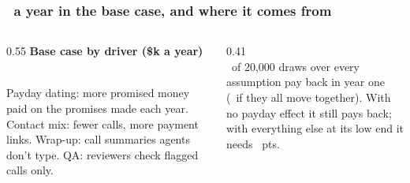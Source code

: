 \documentclass[aspectratio=169,10pt]{beamer}
\begin{document}
\begin{frame}
  \frametitle{\KvalueBase\ a year in the base case, and where it comes from}
  \begin{columns}[T]
    \begin{column}{0.55\textwidth}
      \textbf{\small Base case by driver (\$k a year)}\\[0.4em]
      \\[0.5em]
      {\scriptsize Payday dating: more promised money paid on the promises made each year. Contact mix: fewer calls, more payment links. Wrap-up: call summaries agents don't type. QA: reviewers check flagged calls only.}
    \end{column}
    \begin{column}{0.41\textwidth}
      \\[0.4em]
      {\scriptsize \KpPayback\ of 20,000 draws over every assumption pay back in year one (\KpPaybackTogether\ if they all move together). With no payday effect it still pays back; with everything else at its low end it needs \KbreakevenLow\ pts.}
    \end{column}
  \end{columns}
\end{frame}
\end{document}

